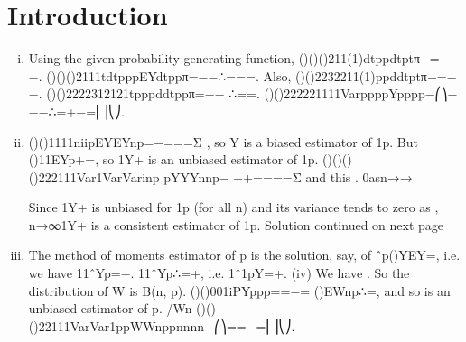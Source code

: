 \documentclass{article}
\author{kobriendublin }
\date{December 2018}
\begin{document}
\section{Introduction}
\begin{enumerate}[(i)]
\item 

 Using the given probability generating function, ()()()211(1)dtppdtptπ−=−−.
()()()2111tdtpppEYdtppπ=−−∴===.
Also, ()()2232211(1)ppddtptπ−=−−.
()()2222312121tpppddtppπ=−− ∴==.
()()222221111VarppppYpppp−⎛⎞−−−∴=+−=⎜⎟⎝⎠.


\item ()()1111niipEYEYnp=−===Σ , so Y is a biased estimator of 1p.
But ()11EYp+=, so 1Y+ is an unbiased estimator of 1p.
()()()()222111Var1VarVarinp pYYYnnp− −+====Σ
and this . 0asn→→

Since 1Y+ is unbiased for 1p (for all n) and its variance tends to zero as , n→∞1Y+ is a consistent estimator of 1p.
Solution continued on next page

\item  The method of moments estimator of p is the solution, say, of ˆp()YEY=, i.e. we have 11ˆYp=−. 11ˆYp∴=+, i.e. 1ˆ1pY=+.
(iv) We have . So the distribution of W is B(n, p). ()()001iPYppp==−=
()EWnp∴=, and so is an unbiased estimator of p. /Wn
()()()22111VarVar1ppWWnppnnnn−⎛⎞==−=⎜⎟⎝⎠.

\end{enumerate}
\end{document}
